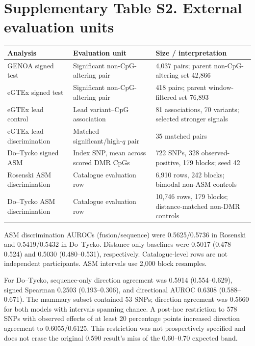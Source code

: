 \documentclass[10pt]{article}
\begin{document}
\section*{Supplementary Table S2. External evaluation units}
\begin{center}\small
\begin{tabular}{p{3.5cm}p{3.7cm}p{6.1cm}}\toprule
Analysis & Evaluation unit & Size / interpretation\\\midrule
GENOA signed test & Significant non-CpG-altering pair & 4,037 pairs; parent non-CpG-altering set 42,866\\
eGTEx signed test & Significant non-CpG-altering pair & 418 pairs; parent window-filtered set 76,893\\
eGTEx lead control & Lead variant--CpG association & 81 associations, 70 variants; selected stronger signals\\
eGTEx lead discrimination & Matched significant/high-$q$ pair & 35 matched pairs\\
Do--Tycko signed ASM & Index SNP, mean across scored DMR CpGs & 722 SNPs, 328 observed-positive, 179 blocks; seed 42\\
Rosenski ASM discrimination & Catalogue evaluation row & 6,910 rows, 242 blocks; bimodal non-ASM controls\\
Do--Tycko ASM discrimination & Catalogue evaluation row & 10,746 rows, 179 blocks; distance-matched non-DMR controls\\\bottomrule
\end{tabular}\end{center}
ASM discrimination AUROCs (fusion/sequence) were 0.5625/0.5736 in Rosenski and 0.5419/0.5432 in Do--Tycko. Distance-only baselines were 0.5017 (0.478--0.524) and 0.5030 (0.480--0.531), respectively. Catalogue-level rows are not independent participants. ASM intervals use 2,000 block resamples.

For Do--Tycko, sequence-only direction agreement was 0.5914 (0.554--0.629), signed Spearman 0.2503 (0.193--0.306), and directional AUROC 0.6308 (0.588--0.671). The mammary subset contained 53 SNPs; direction agreement was 0.5660 for both models with intervals spanning chance. A post-hoc restriction to 578 SNPs with observed effects of at least 20 percentage points increased direction agreement to 0.6055/0.6125. This restriction was not prospectively specified and does not erase the original 0.590 result's miss of the 0.60--0.70 expected band.
\end{document}
